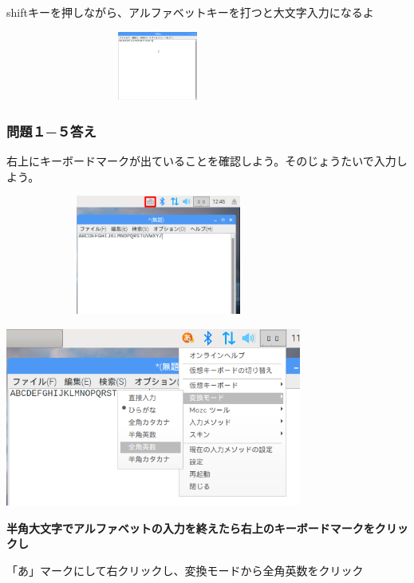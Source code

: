 \documentclass[a4paper,12pt]{jarticle}
\begin{document}
shiftキーを押しながら、アルファベットキーを打つと大文字入力になるよ


\centering
\includegraphics[width=10.031cm,height=2.27cm]{textbook-img217.png}
\flushleft

\clearpage\subsubsection{\bfseries
問題１−５答え}

右上にキーボードマークが出ていることを確認しよう。そのじょうたいで入力しよう。


\bigskip


\centering
\includegraphics[width=10.075cm,height=3.914cm]{textbook-img218.png}
\flushleft


\bigskip





\centering
\includegraphics[width=9.733cm,height=5.851cm]{textbook-img219.png}
\flushleft


\bigskip

{\bfseries
半角大文字でアルファベットの入力を終えたら右上のキーボードマークをクリックし

「あ」マークにして右クリックし、変換モードから全角英数をクリック}
\end{document}
